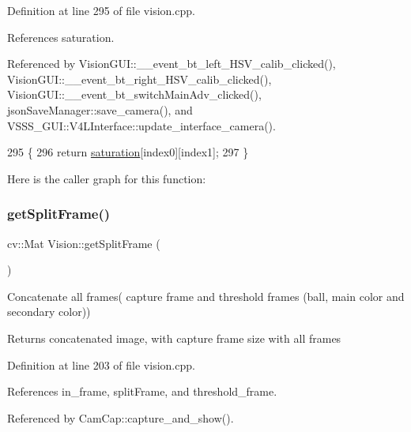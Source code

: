 Definition at line 295 of file vision.\+cpp.



References saturation.



Referenced by Vision\+G\+U\+I\+::\+\_\+\+\_\+event\+\_\+bt\+\_\+left\+\_\+\+H\+S\+V\+\_\+calib\+\_\+clicked(), Vision\+G\+U\+I\+::\+\_\+\+\_\+event\+\_\+bt\+\_\+right\+\_\+\+H\+S\+V\+\_\+calib\+\_\+clicked(), Vision\+G\+U\+I\+::\+\_\+\+\_\+event\+\_\+bt\+\_\+switch\+Main\+Adv\+\_\+clicked(), json\+Save\+Manager\+::save\+\_\+camera(), and V\+S\+S\+S\+\_\+\+G\+U\+I\+::\+V4\+L\+Interface\+::update\+\_\+interface\+\_\+camera().


\begin{DoxyCode}
295                                                 \{
296     \textcolor{keywordflow}{return} \hyperlink{class_vision_a71a7f9859283e916a0dfb1467eaf5b13}{saturation}[index0][index1];
297 \}
\end{DoxyCode}
Here is the caller graph for this function\+:
\mbox{\label{class_vision_a5543116011e744661d9e60a70012bc6c}} 
\subsubsection{\texorpdfstring{get\+Split\+Frame()}{getSplitFrame()}}
{\footnotesize\ttfamily cv\+::\+Mat Vision\+::get\+Split\+Frame (\begin{DoxyParamCaption}{ }\end{DoxyParamCaption})}

Concatenate all frames( capture frame and threshold frames (ball, main color and secondary color)) \begin{DoxyReturn}{Returns}
concatenated image, with capture frame size with all frames 
\end{DoxyReturn}


Definition at line 203 of file vision.\+cpp.



References in\+\_\+frame, split\+Frame, and threshold\+\_\+frame.



Referenced by Cam\+Cap\+::capture\+\_\+and\+\_\+show().


